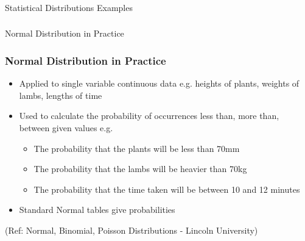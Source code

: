 \begin{frame}[fragile]\frametitle{}
\begin{center}
{\Large Statistical Distributions Examples}
\end{center}
\end{frame}

\begin{frame}[fragile]\frametitle{}
\begin{center}
{\Large Normal Distribution in Practice}
\end{center}
\end{frame}


\begin{frame}
\frametitle{Normal Distribution in Practice}

\begin{itemize}
\item Applied to single variable continuous data e.g. heights of plants, weights of lambs, lengths of time
\item Used to calculate the probability of occurrences less than, more than, between given values e.g. 
\begin{itemize}
\item The probability that the plants will be less than 70mm
\item The probability that the lambs will be heavier than 70kg
\item The probability that the time taken will be between 10 and 12 minutes
\end{itemize}
\item Standard Normal tables give probabilities
\end{itemize}


{\tiny (Ref: Normal, Binomial, Poisson Distributions -  Lincoln University)}
\end{frame}

